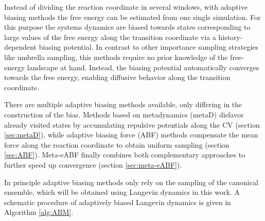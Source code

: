 Instead of dividing the reaction coordinate in several windows, with adaptive biasing methods the free energy can be estimated from one single simulation. For this purpose the systems dynamics are biased towards states corresponding to large values of the free energy along the transition coordinate via a history-dependent biasing potential. In contrast to other importance sampling strategies like umbrella sampling, this methods require no prior knowledge of the free-energy landscape at hand. Instead, the biasing potential automatically converges towards the free energy, enabling diffusive behavior along the transition coordinate.

There are multiple adaptive biasing methods available, only differing in the construction of the bias. Methods based on metadynamics (metaD) disfavor already visited states by accumulating repulsive potentials along the CV (section \ref{sec:metaD}), while adaptive biasing force (ABF) methods compensate the mean force along the reaction coordinate to obtain uniform sampling (section \ref{sec:ABF}). Meta-eABF finally combines both complementary approaches to further speed up convergence (section \ref{sec:meta-eABF}).

In principle adaptive biasing methods only rely on the sampling of the canonical ensemble, which will be obtained using Langevin dynamics in this work. A schematic procedure of adaptively biased Langevin dynamics is given in Algorithm \ref{alg:ABM}.

